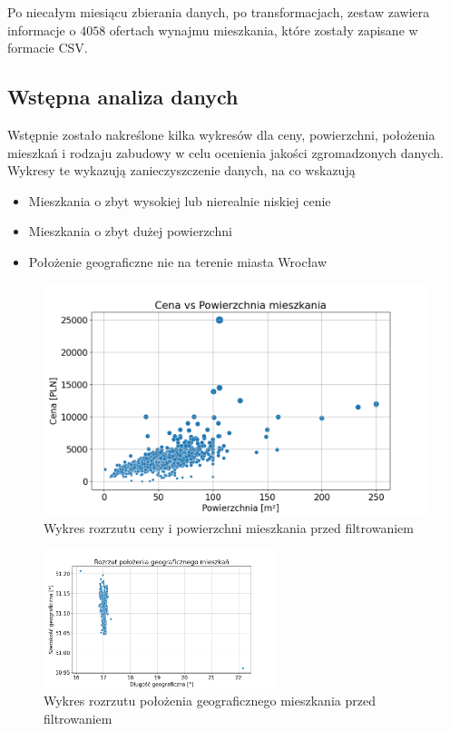 \documentclass[10pt]{article}
\begin{document}
Po niecałym miesiącu zbierania danych, po transformacjach, zestaw zawiera informacje o $ 4058 $ ofertach wynajmu mieszkania, które zostały zapisane w formacie CSV. 


\subsection{Wstępna analiza danych}
Wstępnie zostało nakreślone kilka wykresów dla ceny, powierzchni, położenia mieszkań i rodzaju zabudowy w celu ocenienia jakości zgromadzonych danych. 
Wykresy te wykazują zanieczyszczenie danych, na co wskazują 

\begin{itemize}
    \item Mieszkania o zbyt wysokiej lub nierealnie niskiej cenie
    \item Mieszkania o zbyt dużej powierzchni
    \item Położenie geograficzne nie na terenie miasta Wrocław
\end{itemize}


\begin{figure}[H]
    \centering
    \includegraphics[width=0.6\linewidth]{prices-area-unfiltered.png}
    \caption{Wykres rozrzutu ceny i powierzchni mieszkania przed filtrowaniem}
    \label{fig:prices_area_unfiltered}
\end{figure}

\begin{figure}[H]
    \centering
    \includegraphics[width=0.6\textwidth]{location-unfiltered.png}
    \caption{Wykres rozrzutu położenia geograficznego mieszkania przed filtrowaniem}
    \label{fig:location_unfiltered}
\end{figure}
\end{document}
